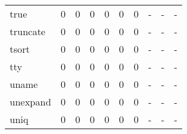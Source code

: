 \begin{longtable}{lp{1.3cm}p{1.3cm}p{1.3cm}p{1.3cm}p{1.3cm}p{1.3cm}p{1.3cm}p{1.3cm}p{1.3cm}}
true      &                      0 &                                             0 &                                            0 &                                           0 &                                            0 &                                          0 &                                    - &                                      - &                                    - \\
truncate  &                      0 &                                             0 &                                            0 &                                           0 &                                            0 &                                          0 &                                    - &                                      - &                                    - \\
tsort     &                      0 &                                             0 &                                            0 &                                           0 &                                            0 &                                          0 &                                    - &                                      - &                                    - \\
tty       &                      0 &                                             0 &                                            0 &                                           0 &                                            0 &                                          0 &                                    - &                                      - &                                    - \\
uname     &                      0 &                                             0 &                                            0 &                                           0 &                                            0 &                                          0 &                                    - &                                      - &                                    - \\
unexpand  &                      0 &                                             0 &                                            0 &                                           0 &                                            0 &                                          0 &                                    - &                                      - &                                    - \\
uniq      &                      0 &                                             0 &                                            0 &                                           0 &                                            0 &                                          0 &                                    - &                                      - &                                    - \\

\end{longtable}
